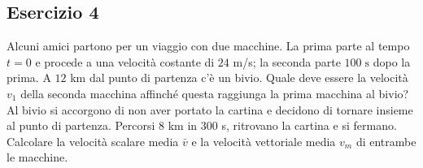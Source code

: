 \documentclass[12pt,a4paper]{book}
\begin{document}

\subsection*{Esercizio 4}
Alcuni amici partono per un viaggio con due macchine. La prima parte al tempo $t=0$ e procede a una velocità costante di $24$ m/s; la seconda parte $100\;\text{s}$ dopo la prima. A $12$ km dal punto di partenza c’è un bivio. Quale deve essere la velocità $v_1$ della seconda macchina affinché questa raggiunga la prima macchina al bivio? Al bivio si accorgono di non aver portato la cartina e decidono di tornare insieme al punto di partenza. Percorsi 8 km in 300 s, ritrovano la cartina e si fermano. Calcolare la velocità scalare media $\bar{v}$ e la velocità vettoriale media $v_m$ di entrambe le macchine.
\end{document}
